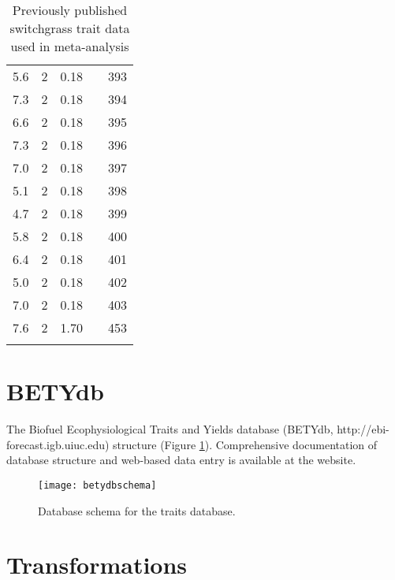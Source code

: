 \documentclass[12pt]{article}
\begin{document}
\begin{flushleft}
\begin{spacing}{1}
\begin{longtable}{rrrlr}
  5.6 &  2 & 0.18 & \citet{redfearn1997cam} & 393 \\* 
  7.3 &  2 & 0.18 & \citet{redfearn1997cam} & 394 \\* 
  6.6 &  2 & 0.18 & \citet{redfearn1997cam} & 395 \\* 
  7.3 &  2 & 0.18 & \citet{redfearn1997cam} & 396 \\* 
  7.0 &  2 & 0.18 & \citet{redfearn1997cam} & 397 \\* 
  5.1 &  2 & 0.18 & \citet{redfearn1997cam} & 398 \\* 
  4.7 &  2 & 0.18 & \citet{redfearn1997cam} & 399 \\* 
  5.8 &  2 & 0.18 & \citet{redfearn1997cam} & 400 \\* 
  6.4 &  2 & 0.18 & \citet{redfearn1997cam} & 401 \\* 
  5.0 &  2 & 0.18 & \citet{redfearn1997cam} & 402 \\* 
  7.0 &  2 & 0.18 & \citet{redfearn1997cam} & 403 \\* 
  7.6 &  2 & 1.70 & \citet{oyarzabal2008tdb} & 453 \\ 
  \hline
  \caption{ Previously published switchgrass trait data used in meta-analysis}
\end{longtable}
\newpage

\section{BETYdb}
\label{app:betydb}

 The Biofuel Ecophysiological Traits and Yields database (BETYdb, http://ebi-forecast.igb.uiuc.edu) structure (Figure \ref{fig:betydbschema}). Comprehensive documentation of database structure and web-based data entry is available at the website.

\begin{figure}[ht!]    
 \texttt{[image: betydbschema]}
 \caption{ Database schema for the traits database.}
 \label{fig:betydbschema}
\end{figure}

\clearpage
\section{Transformations}



\end{spacing}
\end{flushleft}
\end{document}
